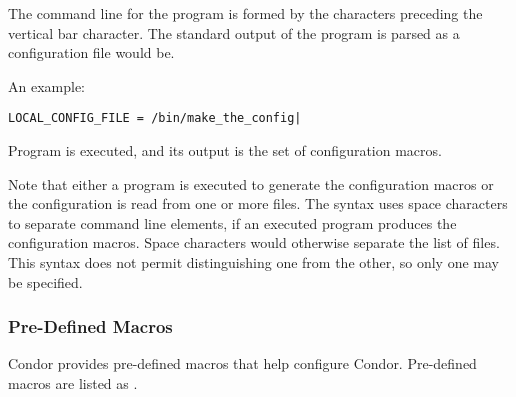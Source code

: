 The command line for the program 
is formed by the characters preceding the vertical bar character.
The standard output of the program is parsed as a configuration 
file would be.

An example:
\begin{verbatim}
LOCAL_CONFIG_FILE = /bin/make_the_config|
\end{verbatim}

Program  is executed, and its output
is the set of configuration macros.

Note that either a program is executed to generate the
configuration macros or the configuration is read from 
one or more files.
The syntax uses space characters to separate command line elements,
if an executed program produces the configuration macros.
Space characters would otherwise separate the list of files.
This syntax does not permit distinguishing one from the other,
so only one may be specified.

\subsubsection{\label{sec:Pre-Defined-Macros}Pre-Defined Macros}

Condor provides pre-defined macros that help configure Condor.
Pre-defined macros are listed as .


